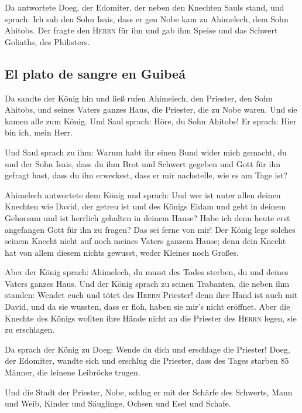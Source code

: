  Da antwortete Doeg, der Edomiter, der neben den Knechten
Sauls stand, und sprach: Ich sah den Sohn Isais, dass er gen Nobe kam zu
Ahimelech, dem Sohn Ahitobs.  Der fragte den
\textsc{Herrn} für ihn und gab ihm Speise und das Schwert Goliaths, des
Philisters.

\hypertarget{el-plato-de-sangre-en-guibeuxe1}{%
\subsection{El plato de sangre en
Guibeá}\label{el-plato-de-sangre-en-guibeuxe1}}

 Da sandte der König hin und ließ rufen Ahimelech, den
Priester, den Sohn Ahitobs, und seines Vaters ganzes Haus, die Priester,
die zu Nobe waren. Und sie kamen alle zum König.  Und
Saul sprach: Höre, du Sohn Ahitobs! Er sprach: Hier bin ich, mein Herr.

 Und Saul sprach zu ihm: Warum habt ihr einen Bund wider
mich gemacht, du und der Sohn Isais, dass du ihm Brot und Schwert
gegeben und Gott für ihn gefragt hast, dass du ihn erweckest, dass er
mir nachstelle, wie es am Tage ist?

 Ahimelech antwortete dem König und sprach: Und wer ist
unter allen deinen Knechten wie David, der getreu ist und des Königs
Eidam und geht in deinem Gehorsam und ist herrlich gehalten in deinem
Hause?  Habe ich denn heute erst angefangen Gott für ihn
zu fragen? Das sei ferne von mir! Der König lege solches seinem Knecht
nicht auf noch meines Vaters ganzem Hause; denn dein Knecht hat von
allem diesem nichts gewusst, weder Kleines noch Großes.

 Aber der König sprach: Ahimelech, du musst des Todes
sterben, du und deines Vaters ganzes Haus.  Und der König
sprach zu seinen Trabanten, die neben ihm standen: Wendet euch und tötet
des \textsc{Herrn} Priester! denn ihre Hand ist auch mit David, und da
sie wussten, dass er floh, haben sie mir's nicht eröffnet. Aber die
Knechte des Königs wollten ihre Hände nicht an die Priester des
\textsc{Herrn} legen, sie zu erschlagen.

 Da sprach der König zu Doeg: Wende du dich und erschlage
die Priester! Doeg, der Edomiter, wandte sich und erschlug die Priester,
dass des Tages starben 85 Männer, die leinene Leibröcke trugen.

 Und die Stadt der Priester, Nobe, schlug er mit der
Schärfe des Schwerts, Mann und Weib, Kinder und Säuglinge, Ochsen und
Esel und Schafe.

